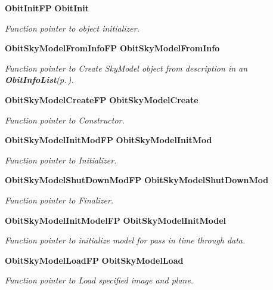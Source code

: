 \begin{CompactItemize}
{\bf Obit\-Init\-FP} {\bf Obit\-Init}
\begin{CompactList}\small\item\em Function pointer to object initializer. \item\end{CompactList}\item 
{\bf Obit\-Sky\-Model\-From\-Info\-FP} {\bf Obit\-Sky\-Model\-From\-Info}
\begin{CompactList}\small\item\em Function pointer to Create Sky\-Model object from description in an {\bf Obit\-Info\-List}{\rm (p.\,\pageref{structObitInfoList})}. \item\end{CompactList}\item 
{\bf Obit\-Sky\-Model\-Create\-FP} {\bf Obit\-Sky\-Model\-Create}
\begin{CompactList}\small\item\em Function pointer to Constructor. \item\end{CompactList}\item 
{\bf Obit\-Sky\-Model\-Init\-Mod\-FP} {\bf Obit\-Sky\-Model\-Init\-Mod}
\begin{CompactList}\small\item\em Function pointer to Initializer. \item\end{CompactList}\item 
{\bf Obit\-Sky\-Model\-Shut\-Down\-Mod\-FP} {\bf Obit\-Sky\-Model\-Shut\-Down\-Mod}
\begin{CompactList}\small\item\em Function pointer to Finalizer. \item\end{CompactList}\item 
{\bf Obit\-Sky\-Model\-Init\-Model\-FP} {\bf Obit\-Sky\-Model\-Init\-Model}
\begin{CompactList}\small\item\em Function pointer to initialize model for pass in time through data. \item\end{CompactList}\item 
{\bf Obit\-Sky\-Model\-Load\-FP} {\bf Obit\-Sky\-Model\-Load}
\begin{CompactList}\small\item\em Function pointer to Load specified image and plane. \item\end{CompactList}\item 

\end{CompactItemize}
